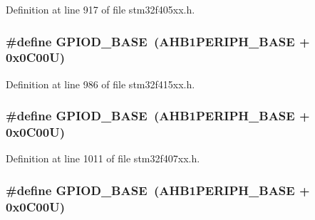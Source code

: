 Definition at line 917 of file stm32f405xx.\+h.

\subsubsection[{\texorpdfstring{G\+P\+I\+O\+D\+\_\+\+B\+A\+SE}{GPIOD_BASE}}]{\setlength{\rightskip}{0pt plus 5cm}\#define G\+P\+I\+O\+D\+\_\+\+B\+A\+SE~({\bf A\+H\+B1\+P\+E\+R\+I\+P\+H\+\_\+\+B\+A\+SE} + 0x0\+C00\+U)}\hypertarget{group___peripheral__registers__structures_ga1a93ab27129f04064089616910c296ec}{}\label{group___peripheral__registers__structures_ga1a93ab27129f04064089616910c296ec}


Definition at line 986 of file stm32f415xx.\+h.

\subsubsection[{\texorpdfstring{G\+P\+I\+O\+D\+\_\+\+B\+A\+SE}{GPIOD_BASE}}]{\setlength{\rightskip}{0pt plus 5cm}\#define G\+P\+I\+O\+D\+\_\+\+B\+A\+SE~({\bf A\+H\+B1\+P\+E\+R\+I\+P\+H\+\_\+\+B\+A\+SE} + 0x0\+C00\+U)}\hypertarget{group___peripheral__registers__structures_ga1a93ab27129f04064089616910c296ec}{}\label{group___peripheral__registers__structures_ga1a93ab27129f04064089616910c296ec}


Definition at line 1011 of file stm32f407xx.\+h.

\subsubsection[{\texorpdfstring{G\+P\+I\+O\+D\+\_\+\+B\+A\+SE}{GPIOD_BASE}}]{\setlength{\rightskip}{0pt plus 5cm}\#define G\+P\+I\+O\+D\+\_\+\+B\+A\+SE~({\bf A\+H\+B1\+P\+E\+R\+I\+P\+H\+\_\+\+B\+A\+SE} + 0x0\+C00\+U)}\hypertarget{group___peripheral__registers__structures_ga1a93ab27129f04064089616910c296ec}{}\label{group___peripheral__registers__structures_ga1a93ab27129f04064089616910c296ec}



